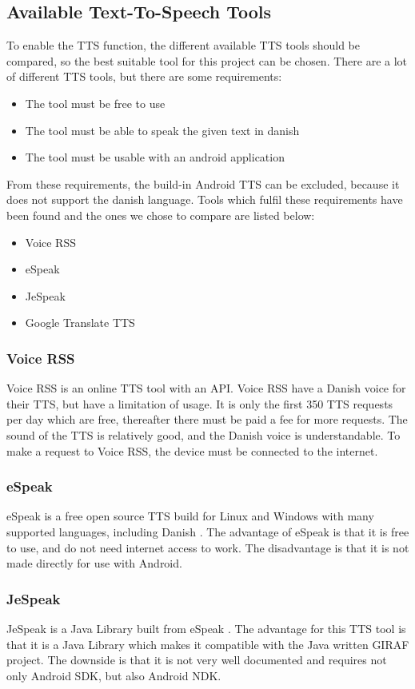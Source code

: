 \subsection{Available Text-To-Speech Tools}
\label{sec:ttstool}
To enable the TTS function, the different available TTS tools should be compared, so the best suitable tool for this project can be chosen.
There are a lot of different TTS tools, but there are some requirements:
\begin{itemize}
	\item The tool must be free to use
	\item The tool must be able to speak the given text in danish
	\item The tool must be usable with an android application
\end{itemize}
From these requirements, the build-in Android TTS can be excluded, because it does not support the danish language.
Tools which fulfil these requirements have been found and the ones we chose to compare are listed below:
\begin{itemize}
	\item Voice RSS
	\item eSpeak
	\item JeSpeak
	\item Google Translate TTS
\end{itemize}

\subsubsection{Voice RSS}
Voice RSS \citep{voicerss} is an online TTS tool with an API. Voice RSS have a Danish voice for their TTS, but have a limitation of usage. It is only the first 350 TTS requests per day which are free, thereafter there must be paid a fee for more requests. The sound of the TTS is relatively good, and the Danish voice is understandable. To make a request to Voice RSS, the device must be connected to the internet.

\subsubsection{eSpeak}
eSpeak is a free open source TTS build for Linux and Windows with many supported languages, including Danish \citep{espeak}. The advantage of eSpeak is that it is free to use, and do not need internet access to work. The disadvantage is that it is not made directly for use with Android. 

\subsubsection{JeSpeak}
JeSpeak is a Java Library built from eSpeak \citep{jespeak}. The advantage for this TTS tool is that it is a Java Library which makes it compatible with the Java written GIRAF project. The downside is that it is not very well documented and requires not only Android SDK, but also Android NDK.


